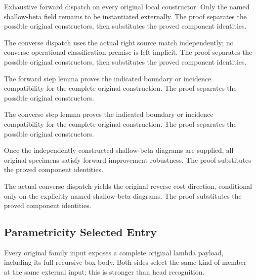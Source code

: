 Exhaustive forward dispatch on every original local constructor. Only
the named shallow-beta field remains to be instantiated externally.
The proof separates the possible original constructors, then substitutes the proved component identities.
\par{}

The converse dispatch uses the actual right source match independently;
no converse operational classification premise is left implicit.
The proof separates the possible original constructors, then substitutes the proved component identities.
\par{}

The forward step lemma proves the indicated boundary or incidence compatibility for the complete original construction.
The proof separates the possible original constructors.
\par{}

The converse step lemma proves the indicated boundary or incidence compatibility for the complete original construction.
The proof separates the possible original constructors.
\par{}

Once the independently constructed shallow-beta diagrams are supplied,
all original specimens satisfy forward improvement robustness.
The proof substitutes the proved component identities.
\par{}

The actual converse dispatch yields the original reverse cost direction,
conditional only on the explicitly named shallow-beta diagrams.
The proof substitutes the proved component identities.
\par{}

\subsection{Parametricity Selected Entry}
Every original family input exposes a complete original lambda payload,
including its full recursive box body. Both sides select the same kind of
member at the same external input; this is stronger than head recognition.

